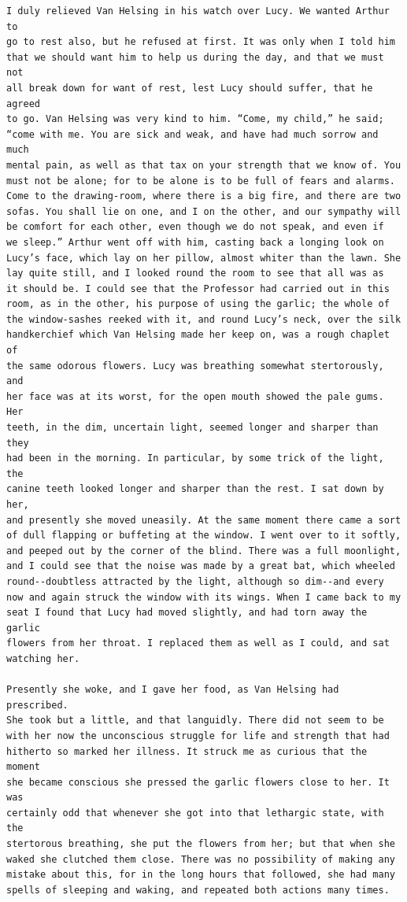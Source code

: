 \documentclass{article}
\begin{document}
\begin{verbatim}
I duly relieved Van Helsing in his watch over Lucy. We wanted Arthur to
go to rest also, but he refused at first. It was only when I told him
that we should want him to help us during the day, and that we must not
all break down for want of rest, lest Lucy should suffer, that he agreed
to go. Van Helsing was very kind to him. “Come, my child,” he said;
“come with me. You are sick and weak, and have had much sorrow and much
mental pain, as well as that tax on your strength that we know of. You
must not be alone; for to be alone is to be full of fears and alarms.
Come to the drawing-room, where there is a big fire, and there are two
sofas. You shall lie on one, and I on the other, and our sympathy will
be comfort for each other, even though we do not speak, and even if
we sleep.” Arthur went off with him, casting back a longing look on
Lucy’s face, which lay on her pillow, almost whiter than the lawn. She
lay quite still, and I looked round the room to see that all was as
it should be. I could see that the Professor had carried out in this
room, as in the other, his purpose of using the garlic; the whole of
the window-sashes reeked with it, and round Lucy’s neck, over the silk
handkerchief which Van Helsing made her keep on, was a rough chaplet of
the same odorous flowers. Lucy was breathing somewhat stertorously, and
her face was at its worst, for the open mouth showed the pale gums. Her
teeth, in the dim, uncertain light, seemed longer and sharper than they
had been in the morning. In particular, by some trick of the light, the
canine teeth looked longer and sharper than the rest. I sat down by her,
and presently she moved uneasily. At the same moment there came a sort
of dull flapping or buffeting at the window. I went over to it softly,
and peeped out by the corner of the blind. There was a full moonlight,
and I could see that the noise was made by a great bat, which wheeled
round--doubtless attracted by the light, although so dim--and every
now and again struck the window with its wings. When I came back to my
seat I found that Lucy had moved slightly, and had torn away the garlic
flowers from her throat. I replaced them as well as I could, and sat
watching her.

Presently she woke, and I gave her food, as Van Helsing had prescribed.
She took but a little, and that languidly. There did not seem to be
with her now the unconscious struggle for life and strength that had
hitherto so marked her illness. It struck me as curious that the moment
she became conscious she pressed the garlic flowers close to her. It was
certainly odd that whenever she got into that lethargic state, with the
stertorous breathing, she put the flowers from her; but that when she
waked she clutched them close. There was no possibility of making any
mistake about this, for in the long hours that followed, she had many
spells of sleeping and waking, and repeated both actions many times.


\end{verbatim}
\end{document}
